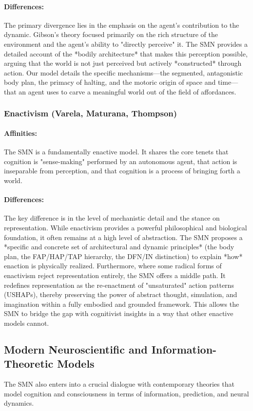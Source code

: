 \paragraph{Differences:} The primary divergence lies in the emphasis on the agent's contribution to the dynamic. Gibson's theory focused primarily on the rich structure of the environment and the agent's ability to "directly perceive" it. The SMN provides a detailed account of the *bodily architecture* that makes this perception possible, arguing that the world is not just perceived but actively *constructed* through action. Our model details the specific mechanisms—the segmented, antagonistic body plan, the primacy of halting, and the motoric origin of space and time—that an agent uses to carve a meaningful world out of the field of affordances.  \subsubsection{Enactivism (Varela, Maturana, Thompson)} \label{ssubsec:enactivism} \paragraph{Affinities:} The SMN is a fundamentally enactive model. It shares the core tenets that cognition is "sense-making" performed by an autonomous agent, that action is inseparable from perception, and that cognition is a process of bringing forth a world.  \paragraph{Differences:} The key difference is in the level of mechanistic detail and the stance on representation. While enactivism provides a powerful philosophical and biological foundation, it often remains at a high level of abstraction. The SMN proposes a *specific and concrete set of architectural and dynamic principles* (the body plan, the FAP/HAP/TAP hierarchy, the DFN/IN distinction) to explain *how* enaction is physically realized. Furthermore, where some radical forms of enactivism reject representation entirely, the SMN offers a middle path. It redefines representation as the re-enactment of "unsaturated" action patterns (USHAPs), thereby preserving the power of abstract thought, simulation, and imagination within a fully embodied and grounded framework. This allows the SMN to bridge the gap with cognitivist insights in a way that other enactive models cannot.
\subsection{Modern Neuroscientific and Information-Theoretic Models}\label{subsec:comparison_modern}The SMN also enters into a crucial dialogue with contemporary theories that model cognition and consciousness in terms of information, prediction, and neural dynamics.
